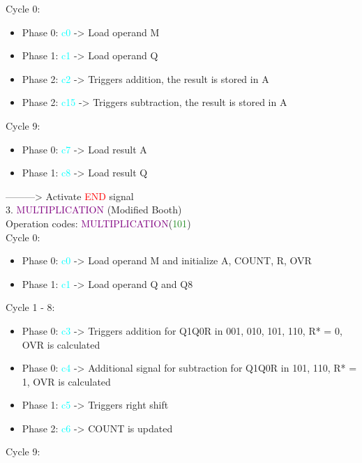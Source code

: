 \documentclass[12pt, letterpaper]{article}
\begin{document}
Cycle 0:

\begin{itemize}
  \item Phase 0: \textcolor{cyan}{c0} -> Load operand M
  \item Phase 1: \textcolor{cyan}{c1} -> Load operand Q
  \item Phase 2: \textcolor{cyan}{c2} -> Triggers addition, the result is stored in A
  \item Phase 2: \textcolor{cyan}{c15} -> Triggers subtraction, the result is stored in A
\end{itemize}


Cycle 9:

\begin{itemize}
  \item Phase 0: \textcolor{cyan}{c7} -> Load result A
  \item Phase 1: \textcolor{cyan}{c8} -> Load result Q
\end{itemize}
---------> Activate \textcolor{red}{END} signal\\

3. \textcolor{purple}{MULTIPLICATION} (Modified Booth)\\

Operation codes: \textcolor{purple}{MULTIPLICATION}(\textcolor{ForestGreen}{101})\\

Cycle 0:

\begin{itemize} \item Phase 0: \textcolor{cyan}{c0} -> Load operand M and initialize A, COUNT, R, OVR \item Phase 1: \textcolor{cyan}{c1} -> Load operand Q and Q8 \end{itemize}

Cycle 1 - 8:

\begin{itemize} \item Phase 0: \textcolor{cyan}{c3} -> Triggers addition for Q1Q0R in {001, 010, 101, 110}, R* = 0, OVR is calculated \item Phase 0: \textcolor{cyan}{c4} -> Additional signal for subtraction for Q1Q0R in {101, 110}, R* = 1, OVR is calculated \item Phase 1: \textcolor{cyan}{c5} -> Triggers right shift \item Phase 2: \textcolor{cyan}{c6} -> COUNT is updated \end{itemize}

Cycle 9:
\end{document}
